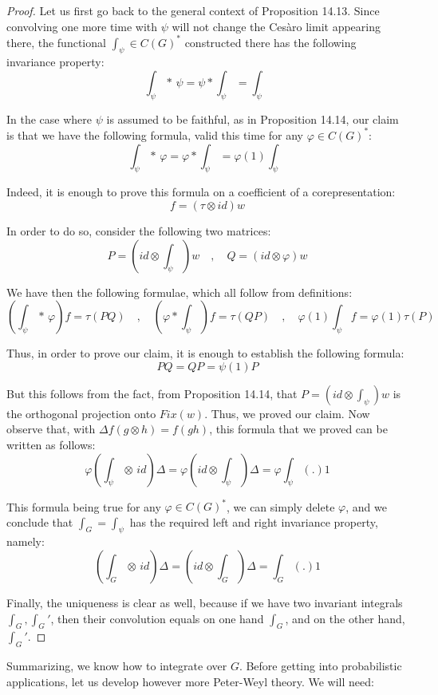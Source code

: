 \documentclass[12pt]{amsbook}
\begin{document}
\begin{proof}
Let us first go back to the general context of Proposition 14.13. Since convolving one more time with $\psi$ will not change the Ces\`aro limit appearing there, the functional $\int_\psi\in C(G)^*$ constructed there has the following invariance property:
$$\int_\psi*\,\psi=\psi*\int_\psi=\int_\psi$$

In the case where $\psi$ is assumed to be faithful, as in Proposition 14.14, our claim is that we have the following formula, valid this time for any $\varphi\in C(G)^*$:
$$\int_\psi*\,\varphi=\varphi*\int_\psi=\varphi(1)\int_\psi$$

Indeed, it is enough to prove this formula on a coefficient of a corepresentation:
$$f=(\tau\otimes id)w$$

In order to do so, consider the following two matrices:
$$P=\left(id\otimes\int_\psi\right)w\quad,\quad 
Q=(id\otimes\varphi)w$$

We have then the following formulae, which all follow from definitions:
$$\left(\int_\psi*\,\varphi\right)f=\tau(PQ)\quad,\quad 
\left(\varphi*\int_\psi\right)f=\tau(QP)\quad,\quad 
\varphi(1)\int_\psi f=\varphi(1)\tau(P)$$

Thus, in order to prove our claim, it is enough to establish the following formula:
$$PQ=QP=\psi(1)P$$

But this follows from the fact, from Proposition 14.14, that $P=(id\otimes\int_\psi)w$ is the orthogonal projection onto $Fix(w)$. Thus, we proved our claim. Now observe that, with $\Delta f(g\otimes h)=f(gh)$, this formula that we proved can be written as follows:
$$\varphi\left(\int_\psi\otimes\,id\right)\Delta
=\varphi\left(id\otimes\int_\psi\right)\Delta
=\varphi\int_\psi(.)1$$

This formula being true for any $\varphi\in C(G)^*$, we can simply delete $\varphi$, and we conclude that $\int_G=\int_\psi$ has the required left and right invariance property, namely:
$$\left(\int_G\otimes\,id\right)\Delta
=\left(id\otimes\int_G\right)\Delta
=\int_G(.)1$$

Finally, the uniqueness is clear as well, because if we have two invariant integrals $\int_G,\int_G'$, then their convolution equals on one hand $\int_G$, and on the other hand, $\int_G'$.
\end{proof}

Summarizing, we know how to integrate over $G$. Before getting into probabilistic applications, let us develop however more Peter-Weyl theory. We will need:
\end{document}
